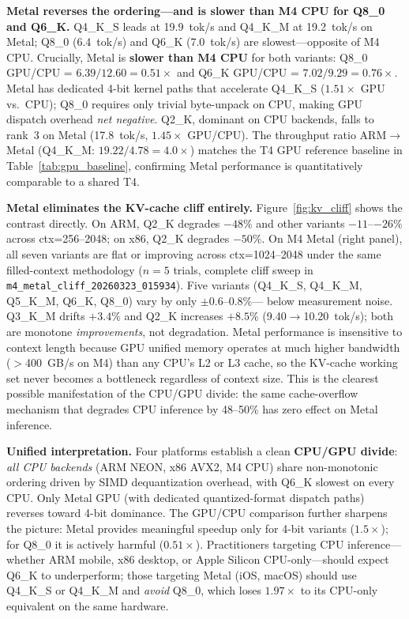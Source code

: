 \documentclass[conference]{IEEEtran}
\begin{document}
\textbf{Metal reverses the ordering---and is slower than M4 CPU for Q8\_0 and Q6\_K.}
Q4\_K\_S leads at 19.9~tok/s and Q4\_K\_M at 19.2~tok/s on Metal;
Q8\_0 (6.4~tok/s) and Q6\_K (7.0~tok/s) are slowest---opposite of M4 CPU.
Crucially, Metal is \textbf{slower than M4 CPU} for both variants:
Q8\_0 GPU/CPU = $6.39/12.60 = 0.51\times$ and Q6\_K GPU/CPU = $7.02/9.29 = 0.76\times$.
Metal has dedicated 4-bit kernel paths that accelerate Q4\_K\_S ($1.51\times$ GPU vs.\ CPU);
Q8\_0 requires only trivial byte-unpack on CPU, making GPU dispatch overhead \emph{net negative}.
Q2\_K, dominant on CPU backends, falls to rank~3 on Metal (17.8~tok/s, $1.45\times$ GPU/CPU).
The throughput ratio ARM$\to$Metal (Q4\_K\_M: $19.22 / 4.78 = 4.0\times$)
matches the T4 GPU reference baseline in Table~\ref{tab:gpu_baseline},
confirming Metal performance is quantitatively comparable to a shared T4.

\textbf{Metal eliminates the KV-cache cliff entirely.}
Figure~\ref{fig:kv_cliff} shows the contrast directly.
On ARM, Q2\_K degrades $-48\%$ and other variants $-11$--$-26\%$ across
ctx=256--2048; on x86, Q2\_K degrades $-50\%$.
On M4 Metal (right panel), all seven variants are flat or improving across
ctx=1024--2048 under the same filled-context methodology ($n{=}5$ trials,
complete cliff sweep in \texttt{m4\_metal\_cliff\_20260323\_015934}).
Five variants (Q4\_K\_S, Q4\_K\_M, Q5\_K\_M, Q6\_K, Q8\_0) vary by only $\pm0.6$--$0.8\%$---
below measurement noise.
Q3\_K\_M drifts $+3.4\%$ and Q2\_K increases $+8.5\%$ (9.40$\to$10.20~tok/s);
both are monotone \emph{improvements}, not degradation.
Metal performance is insensitive to context length because GPU unified memory
operates at much higher bandwidth ($>$400~GB/s on M4) than any CPU's L2 or L3
cache, so the KV-cache working set never becomes a bottleneck regardless of context size.
This is the clearest possible manifestation of the CPU/GPU divide:
the same cache-overflow mechanism that degrades CPU inference by 48--50\%
has zero effect on Metal inference.

\textbf{Unified interpretation.}
Four platforms establish a clean \textbf{CPU/GPU divide}:
\emph{all CPU backends} (ARM NEON, x86 AVX2, M4 CPU) share non-monotonic ordering
driven by SIMD dequantization overhead, with Q6\_K slowest on every CPU.
Only Metal GPU (with dedicated quantized-format dispatch paths) reverses toward 4-bit dominance.
The GPU/CPU comparison further sharpens the picture: Metal provides meaningful speedup
only for 4-bit variants ($1.5\times$); for Q8\_0 it is actively harmful ($0.51\times$).
Practitioners targeting CPU inference---whether ARM mobile, x86 desktop, or Apple Silicon CPU-only---should
expect Q6\_K to underperform; those targeting Metal (iOS, macOS) should use Q4\_K\_S or Q4\_K\_M
and \emph{avoid} Q8\_0, which loses $1.97\times$ to its CPU-only equivalent on the same hardware.
\end{document}
